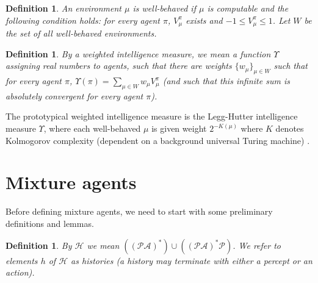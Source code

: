 \documentclass{article}
\newtheorem{definition}[theorem]{Definition}
\begin{document}
\begin{definition}
    An environment $\mu$ is \emph{well-behaved} if $\mu$ is computable and the following
    condition holds: for every agent $\pi$, $V^\pi_\mu$ exists and
    $-1\leq V^\pi_\mu\leq 1$. Let $W$ be the set of all well-behaved environments.
\end{definition}

\begin{definition}
\label{performanceaveragerdefn}
    By a \emph{weighted intelligence measure}, we mean a function
    $\Upsilon$ assigning real numbers to agents, such that there
    are weights $\{w_\mu\}_{\mu\in W}$ such that for every agent
    $\pi$, $\Upsilon(\pi)=\sum_{\mu\in W}w_\mu V^\pi_\mu$
    (and such that this infinite sum is absolutely convergent
    for every agent $\pi$).
\end{definition}

The prototypical weighted intelligence measure is the Legg-Hutter intelligence
measure $\Upsilon$, where each well-behaved $\mu$ is given weight $2^{-K(\mu)}$
where $K$ denotes Kolmogorov complexity (dependent on a background universal
Turing machine) \cite{legg2007universal}.

\section{Mixture agents}

Before defining mixture agents, we need to start with some preliminary definitions
and lemmas.

\begin{definition}
    By $\mathcal H$ we mean
    $((\mathcal P\mathcal A)^*)\cup((\mathcal P\mathcal A)^*\mathcal P)$.
    We refer to elements $h$ of $\mathcal H$ as \emph{histories} (a history
    may terminate with either a percept or an action).
\end{definition}
\end{document}
